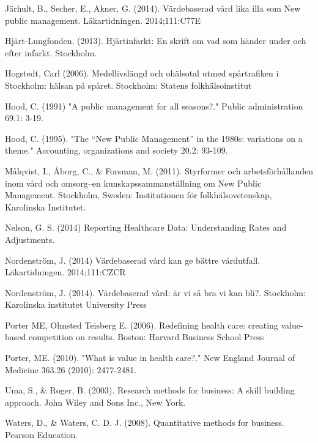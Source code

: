 Järhult, B., Secher, E., Akner, G. (2014). Värdebaserad vård lika illa som New public management. Läkartidningen. 2014;111:C77E\newline

Hjärt-Lungfonden. (2013). Hjärtinfarkt: En skrift om vad som händer under och efter infarkt. Stockholm.\newline

Hogstedt, Carl (2006). Medellivslängd och ohälsotal utmed spårtrafiken i Stockholm: hälsan på spåret. Stockholm: Statens folkhälsoinstitut\newline

Hood, C. (1991) "A public management for all seasons?." Public administration 69.1: 3-19.\newline

Hood, C. (1995). "The “New Public Management” in the 1980s: variations on a theme." Accounting, organizations and society 20.2: 93-109.\newline

Målqvist, I., Åborg, C., \& Forsman, M. (2011). Styrformer och arbetsförhållanden inom vård och omsorg–en kunskapssammanställning om New Public Management. Stockholm, Sweden: Institutionen för folkhälsovetenskap, Karolinska Institutet.\newline

Nelson, G. S. (2014) Reporting Healthcare Data: Understanding Rates and Adjustments.\newline

Nordenström, J. (2014) Värdebaserad vård kan ge bättre vårdutfall.  Läkartidningen. 2014;111:CZCR\newline

Nordenström, J. (2014). Värdebaserad vård: är vi så bra vi kan bli?. Stockholm: Karolinska institutet University Press\newline

Porter ME, Olmsted Teisberg E. (2006). Redefining health care: creating value-based competition on results. Boston: Harvard Business School Press\newline

Porter, ME. (2010). "What is value in health care?." New England Journal of Medicine 363.26 (2010): 2477-2481.\newline

Uma, S., \& Roger, B. (2003). Research methods for business: A skill building approach. John Wiley and Sons Inc., New York.\newline

Waters, D., \& Waters, C. D. J. (2008). Quantitative methods for business. Pearson Education.\newline

